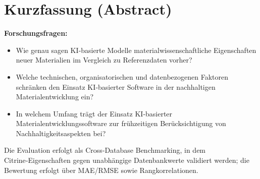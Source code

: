 \chapter*{Kurzfassung (Abstract)}

\textbf{Forschungsfragen:}
\begin{itemize}
	\item Wie genau sagen KI‑basierte Modelle materialwissenschaftliche Eigenschaften neuer Materialien im Vergleich zu Referenzdaten vorher?
	\item Welche technischen, organisatorischen und datenbezogenen Faktoren schränken den Einsatz KI‑basierter Software in der nachhaltigen Materialentwicklung ein?
	\item In welchem Umfang trägt der Einsatz KI‑basierter Materialentwicklungssoftware zur frühzeitigen Berücksichtigung von Nachhaltigkeitsaspekten bei?
\end{itemize}

Die Evaluation erfolgt als Cross‑Database Benchmarking, in dem Citrine‑Eigenschaften gegen unabhängige Datenbankwerte validiert werden; die Bewertung erfolgt über MAE/RMSE sowie Rangkorrelationen.
